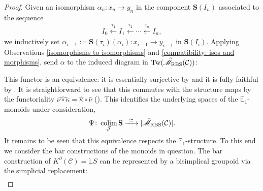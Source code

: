 \documentclass[12pt, reqno]{amsart}
\theoremstyle{plain}
\theoremstyle{definition}
\renewcommand{\phi}{\varphi}
\begin{document}
\begin{proof}
Given an isomorphism $\alpha_n\colon x_n\rightarrow y_n$ in the component $\mathbf{S}(I_n)$ associated to the sequence
\begin{align*}
I_0\xleftarrow{\tau_1} I_1\xleftarrow{\tau_2} \cdots \xleftarrow{\tau_n} I_n,
\end{align*}
we inductively set $\alpha_{i-1}:=\mathbf{S}(\tau_i)(\alpha_i)\colon x_{i-1}\rightarrow y_{i-1}$ in $\mathbf{S}(I_i)$. Applying Observations \ref{isomorphisms to isomorphisms} and \ref{compatibility: isos and morphisms}, send $\alpha$ to the induced diagram in $\operatorname{Tw}(\accentset{\sim}{\mathscr{M}}_{\operatorname{RBS}}(\mathcal{C}))$:
\begin{center}
\end{center}
This functor is an equivalence: it is essentially surjective by  and it is fully faithful by . It is straightforward to see that this commutes with the structure maps by the functoriality $\widehat{\nu\circ \kappa}=\hat{\kappa}\circ \hat{\nu}$ (). This identifies the underlying spaces of the $\mathbb{E}_1$-monoids under consideration,
\begin{align*}
\Psi\colon \mathop{\operatorname{colim}}_{\mathcal{J}}\mathbf{S} \xrightarrow{\ \simeq\ } |\accentset{\sim}{\mathscr{M}}_{\operatorname{RBS}}(\mathcal{C})|.
\end{align*}
It remains to be seen that this equivalence respects the $\mathbb{E}_1$-structure. To this end we consider the bar constructions of the monoids in question. The bar construction of $K^\partial(\mathcal{C})=\mathbb{L}S$ can be represented by a bisimplical groupoid via the simplicial replacement:
\begin{align*}

\end{align*}
\end{proof}
\end{document}
